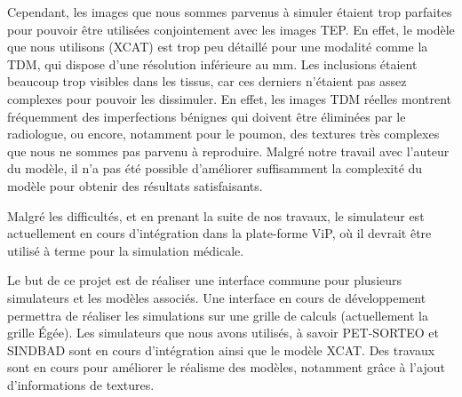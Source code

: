 Cependant, les images que nous sommes parvenus à simuler étaient trop parfaites pour pouvoir être utilisées conjointement avec les images TEP. En effet, le modèle que nous utilisons (XCAT) est trop peu détaillé pour une modalité comme la TDM, qui dispose d'une résolution inférieure au mm. Les inclusions étaient beaucoup trop visibles dans les tissus, car ces derniers n'étaient pas assez complexes pour pouvoir les dissimuler. En effet, les images TDM réelles montrent fréquemment des imperfections bénignes qui doivent être éliminées par le radiologue, ou encore, notamment pour le poumon, des textures très complexes que nous ne sommes pas parvenu à reproduire. Malgré notre travail avec l'auteur du modèle, il n'a pas été possible d'améliorer suffisamment la complexité du modèle pour obtenir des résultats satisfaisants.

Malgré les difficultés, et en prenant la suite de nos travaux, le simulateur est actuellement en cours d'intégration dans la plate-forme ViP, où il devrait être utilisé à terme pour la simulation médicale.

Le but de ce projet est de réaliser une interface commune pour plusieurs simulateurs et les modèles associés. Une interface en cours de développement permettra de réaliser les simulations sur une grille de calculs (actuellement la grille Égée). Les simulateurs que nous avons utilisés, à savoir PET-SORTEO et SINDBAD sont en cours d'intégration ainsi que le modèle XCAT. Des travaux sont en cours pour améliorer le réalisme des modèles, notamment grâce à l'ajout d'informations de textures. 









